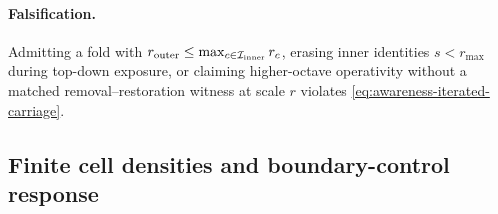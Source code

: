 \paragraph{Falsification.}
Admitting a fold with \(r_{\rm outer}\le\max_{c\in\mathcal I_{\rm inner}}r_c\),
erasing inner identities \(s<r_{\max}\) during top-down exposure, or claiming
higher-octave operativity without a matched removal--restoration witness at
scale \(r\) violates \eqref{eq:awareness-iterated-carriage}.


\subsection{Finite cell densities and boundary-control response}
\label{subsec:awareness-density-reos}
